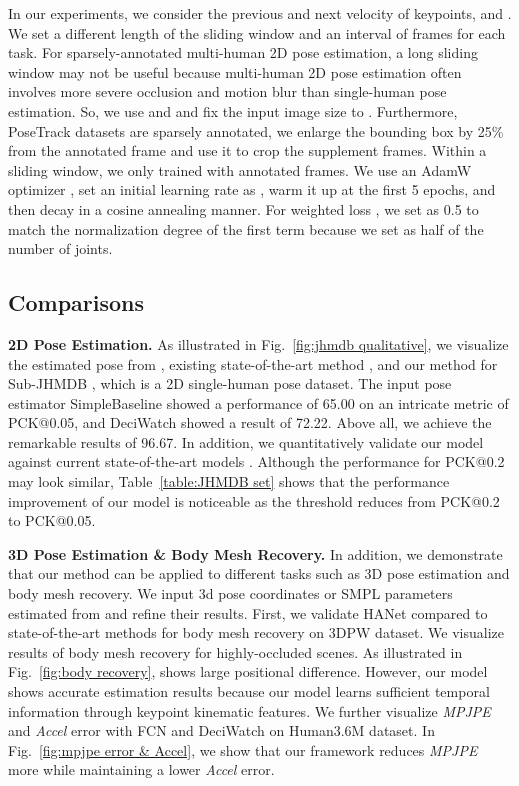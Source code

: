 \documentclass[10pt,twocolumn,letterpaper]{article}
\begin{document}
In our experiments, we consider the previous and next velocity of keypoints,  and . We set a different length  of the sliding window and an interval of frames  for each task. For sparsely-annotated multi-human 2D pose estimation, a long sliding window may not be useful because multi-human 2D pose estimation often involves more severe occlusion and motion blur than single-human pose estimation. So, we use  and  and fix the input image size to . Furthermore, PoseTrack datasets \cite{posetrack2017,posetrack2018} are sparsely annotated, we enlarge the bounding box by 25\% from the annotated frame and use it to crop the supplement frames. Within a sliding window, we only trained with annotated frames. We use an AdamW optimizer \cite{adamw}, set an initial learning rate as , warm it up at the first 5 epochs, and then decay in a cosine annealing manner. For weighted loss , we set  as 0.5 to match the normalization degree of the first term because we set  as half of the number of joints. 

\subsection{Comparisons}

\textbf{2D Pose Estimation.} As illustrated in Fig.~\ref{fig:jhmdb qualitative}, we visualize the estimated pose from \cite{simplebaseline}, existing  state-of-the-art method \cite{deciwatch}, and our method for Sub-JHMDB \cite{jhmdb}, which is a 2D single-human pose dataset. The input pose estimator SimpleBaseline \cite{simplebaseline} showed a performance of 65.00 on an intricate metric of PCK@0.05, and DeciWatch \cite{deciwatch} showed a result of 72.22. Above all, we achieve the remarkable results of 96.67. In addition, we quantitatively validate our model against current state-of-the-art models \cite{dkd,kfp,simplebaseline,deciwatch}. Although the performance for PCK@0.2 may look similar, Table~\ref{table:JHMDB set} shows that the performance improvement of our model is noticeable as the threshold reduces from PCK@0.2 to PCK@0.05.

\textbf{3D Pose Estimation \& Body Mesh Recovery.} In addition, we demonstrate that our method can be applied to different tasks such as 3D pose estimation and body mesh recovery. We input 3d pose coordinates or SMPL parameters estimated from \cite{pare,spin,fcn,li2022mhformer} and refine their results. First, we validate HANet compared to state-of-the-art methods \cite{pare} for body mesh recovery on 3DPW \cite{3dpw} dataset. We visualize results of body mesh recovery for highly-occluded scenes. As illustrated in Fig.~\ref{fig:body recovery}, \cite{pare} shows large positional difference. However, our model shows accurate estimation results because our model learns sufficient temporal information through keypoint kinematic features. We further visualize \textit{MPJPE} and \textit{Accel} error with FCN \cite{fcn} and DeciWatch \cite{deciwatch} on Human3.6M \cite{h36m} dataset. In Fig.~\ref{fig:mpjpe error & Accel}, we show that our framework reduces \textit{MPJPE} more while maintaining a lower \textit{Accel} error. 
\end{document}
